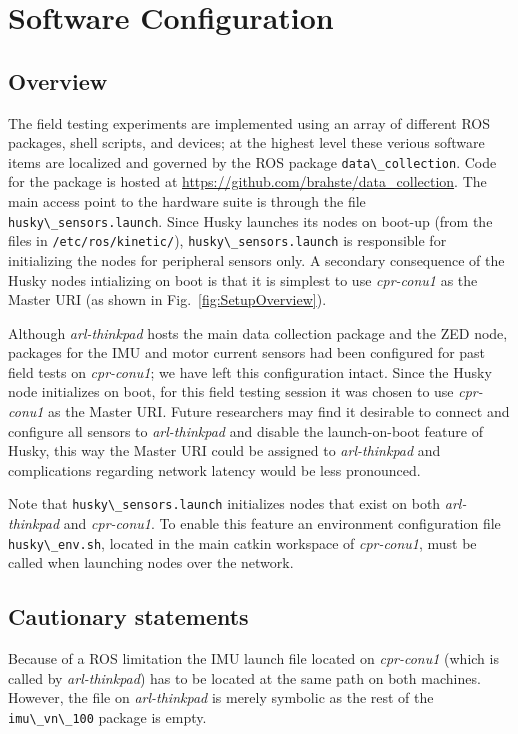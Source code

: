 \documentclass[
	12pt, %
]{fphw}
\newcommand{\code}[1]{\colorbox{light-gray}{\lstinline|#1|}}
\begin{document}
\section{Software Configuration}
\label{sec:SoftwareConfiguration}

\subsection{Overview}

The field testing experiments are implemented using an array of different ROS packages, shell scripts, and devices; at the highest level these verious software items are localized and governed by the ROS package \code{data\_collection}. Code for the package is hosted at \url{https://github.com/brahste/data_collection}. The main access point to the hardware suite is through the file \code{husky\_sensors.launch}. Since Husky launches its nodes on boot-up (from the files in \code{/etc/ros/kinetic/}), \code{husky\_sensors.launch} is responsible for initializing the nodes for peripheral sensors only. A secondary consequence of the Husky nodes intializing on boot is that it is simplest to use \emph{cpr-conu1} as the Master URI (as shown in Fig.~\ref{fig:SetupOverview}). 

Although \emph{arl-thinkpad} hosts the main data collection package and the ZED node, packages for the IMU and motor current sensors had been configured for past field tests on \emph{cpr-conu1}; we have left this configuration intact. Since the Husky node initializes on boot, for this field testing session it was chosen to use \emph{cpr-conu1} as the Master URI. Future researchers may find it desirable to connect and configure all sensors to \textit{arl-thinkpad} and disable the launch-on-boot feature of Husky, this way the Master URI could be assigned to \textit{arl-thinkpad} and complications regarding network latency would be less pronounced.

Note that \code{husky\_sensors.launch} initializes nodes that exist on both \emph{arl-thinkpad} and \emph{cpr-conu1}. To enable this feature an environment configuration file \code{husky\_env.sh}, located in the main catkin workspace of \emph{cpr-conu1}, must be called when launching nodes over the network. 

\subsection{Cautionary statements}

Because of a ROS limitation the IMU launch file located on \emph{cpr-conu1} (which is called by \emph{arl-thinkpad}) has to be located at the same path on both machines. However, the file on \emph{arl-thinkpad} is merely symbolic as the rest of the \code{imu\_vn\_100} package is empty.
\end{document}
